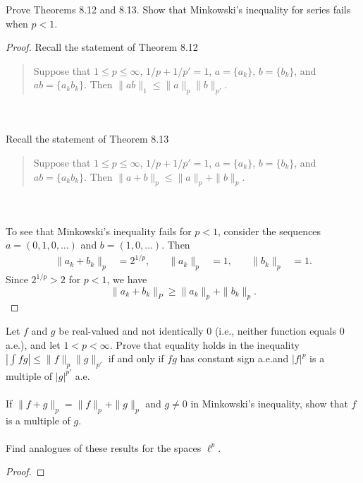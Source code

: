 \begin{problem}
Prove Theorems 8.12 and 8.13. Show that Minkowski’s inequality for series
fails when $p<1$.
\end{problem}
\begin{proof}
Recall the statement of Theorem 8.12
\begin{quote}
Suppose that $1\leq p\leq\infty$, $1/p+1/p'=1$, $a=\{a_k\}$, $b=\{b_k\}$,
and $ab=\{a_kb_k\}$. Then $\|ab\|_1\leq\|a\|_p\|b\|_{p'}$.
\end{quote}
\\\\
Recall the statement of Theorem 8.13
\begin{quote}
Suppose that $1\leq p\leq\infty$, $1/p+1/p'=1$, $a=\{a_k\}$, $b=\{b_k\}$,
and $ab=\{a_kb_k\}$. Then $\|a+b\|_p\leq\|a\|_p+\|b\|_p$.
\end{quote}
\\\\
To see that Minkowski's inequality fails for $p<1$, consider the sequences
$a=(0,1,0,\dotsc)$ and $b=(1,0,\dotsc)$. Then
\[
\begin{aligned}
\|a_k+b_k\|_p&=2^{1/p},\quad&\|a_k\|_p&=1,\quad&\|b_k\|_p&=1.
\end{aligned}
\]
Since $2^{1/p}>2$ for $p<1$, we have
\[
\|a_k+b_k\|_P\geq\|a_k\|_p+\|b_k\|_p.
\]
\end{proof}
\newpage

\begin{problem}
Let $f$ and $g$ be real-valued and not identically $0$ (i.e., neither
function equals $0$ a.e.), and let $1<p<\infty$. Prove that equality holds
in the inequality $\left|\int fg\right|\leq\|f\|_p\|g\|_{p'}$ if and only if
$fg$ has constant sign a.e.\@ and $|f|^p$ is a multiple of $|g|^{p'}$ a.e.
\\\\
If $\|f+g\|_p=\|f\|_p+\|g\|_{p}$ and $g\neq 0$ in Minkowski's inequality,
show that $f$ is a multiple of $g$.
\\\\
Find analogues of these results for the spaces $\ell^p$.
\end{problem}
\begin{proof}

\end{proof}
\newpage

